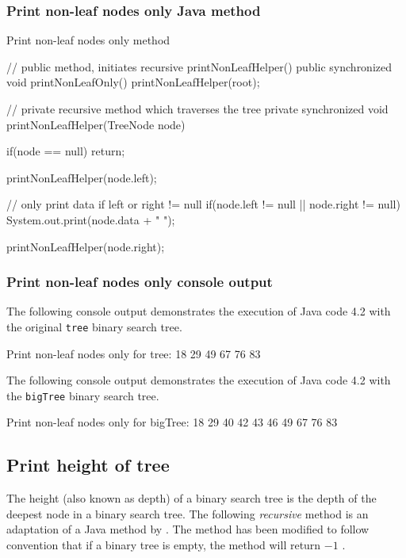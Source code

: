 \subsubsection{Print non-leaf nodes only Java method}

\begin{listing}[H]
\caption{Print non-leaf nodes only method}
\begin{javacode}
// public method, initiates recursive printNonLeafHelper()
public synchronized void printNonLeafOnly() {
    printNonLeafHelper(root);
}

// private recursive method which traverses the tree
private synchronized void printNonLeafHelper(TreeNode node) {
    if(node == null) {
        return;
    }

    printNonLeafHelper(node.left);

    // only print data if left or right != null
    if(node.left != null || node.right != null) {
        System.out.print(node.data + " ");
    }

    printNonLeafHelper(node.right);
}
\end{javacode}
\end{listing}

\subsubsection{Print non-leaf nodes only console output}

The following console output demonstrates the execution of Java code 4.2 with the original \texttt{tree} binary search tree.
\\
\begin{consolecode}
Print non-leaf nodes only for tree:
18 29 49 67 76 83 
\end{consolecode}

\noindent
The following console output demonstrates the execution of Java code 4.2 with the \texttt{bigTree} binary search tree.
\\
\begin{consolecode}
Print non-leaf nodes only for bigTree:
18 29 40 42 43 46 49 67 76 83 
\end{consolecode}

\newpage
\subsection{Print height of tree}

The height (also known as depth) of a binary search tree is the depth of the deepest node in a binary search tree. The following \emph{recursive} method is an adaptation of a Java method by \citet{Flaschen2014}. The method has been modified to follow convention that if a binary tree is empty, the method will return $-1$ \citep[p. 239]{Watt2001}.


